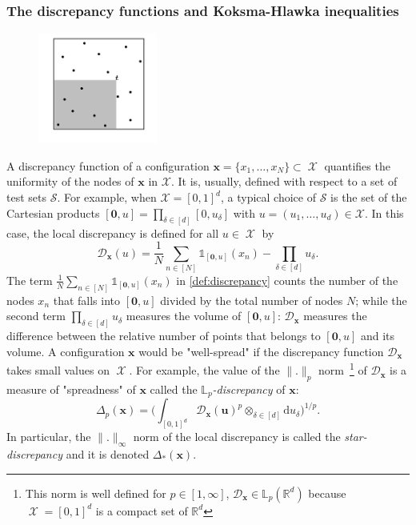 \documentclass[twoside,11pt]{book}
\numberwithin{theorem}{chapter}
\numberwithin{definition}{chapter}
\numberwithin{proposition}{chapter}
\numberwithin{corollary}{chapter}
\numberwithin{example}{chapter}
\numberwithin{lemma}{chapter}
\DeclareMathOperator{\X}{\mathcal{X}}
\begin{document}
 
\subsubsection{The discrepancy functions and Koksma-Hlawka inequalities}

\begin{figure}
\centering
\includegraphics[width= 0.35\textwidth]{img/discrepancy/local_disc.png}
\caption{\label{fig:local_discrepancy}}
\end{figure}

 A discrepancy function of a configuration $\bm{x} = \{x_{1}, \dots, x_{N} \} \subset \X$ quantifies the uniformity of the nodes of $\bm{x}$ in $\mathcal{X}$. It is, usually, defined with respect to a set of test sets $\mathcal{S}$. For example, when $\mathcal{X} = [0,1]^{d}$, a typical choice of $\mathcal{S}$ is the set of the Cartesian products $[\bm{0},u] = \prod\limits_{\delta \in [d]}[0,u_{\delta}]$ with $u = (u_{1}, \dots, u_{d}) \in \mathcal{X}$. In this case, the local discrepancy is defined for all $u \in \X$ by 
\begin{equation}\label{def:discrepancy}
\mathcal{D}_{\bm{x}}(u) = \frac{1}{N}\sum\limits_{n \in [N]} \mathbb{1}_{[\bm{0},u]}(x_{n}) - \prod\limits_{\delta \in [d]}u_{\delta}.
\end{equation}  
The term $\displaystyle \frac{1}{N}\sum\limits_{n \in [N]} \mathbb{1}_{[\bm{0},u]}(x_{n})$ in \eqref{def:discrepancy} counts the number of the nodes $x_{n}$ that falls into $[\bm{0},u]$ divided by the total number of nodes $N$; while the second term $\displaystyle  \prod\limits_{\delta \in [d]}u_{\delta}$ measures the volume of $[\bm{0},u]$: $\mathcal{D}_{\bm{x}}$ measures the difference between the relative number of points that belongs to $[\bm{0},u]$ and its volume. A configuration $\bm{x}$ would be "well-spread" if the discrepancy function $\mathcal{D}_{\bm{x}}$ takes small values on $\X$. For example, the value of the $\|.\|_{p}$ norm~\footnote{This norm is well defined for $p \in [1,\infty]$, $\mathcal{D}_{\bm{x}} \in \mathbb{L}_{p}(\mathbb{R}^{d})$ because $\X = [0,1]^{d}$ is a compact set of $\mathbb{R}^{d}$} of $\mathcal{D}_{\bm{x}}$ is a measure of "spreadness" of $\bm{x}$ called the \emph{$\mathbb{L}_{p}$-discrepancy} of $\bm{x}$:
\begin{equation}
\Delta_{p}(\bm{x}) = \bigg(\int_{[0,1]^{d}}\mathcal{D}_{\bm{x}}(\bm{u})^{p} \otimes_{\delta \in [d]} \mathrm{d}u_{\delta}\bigg)^{1/p}.
\end{equation}
In particular, the $\|.\|_{\infty}$ norm of the local discrepancy is called the \emph{star-discrepancy} and it is denoted $\Delta_{*}(\bm{x})$.
\end{document}
